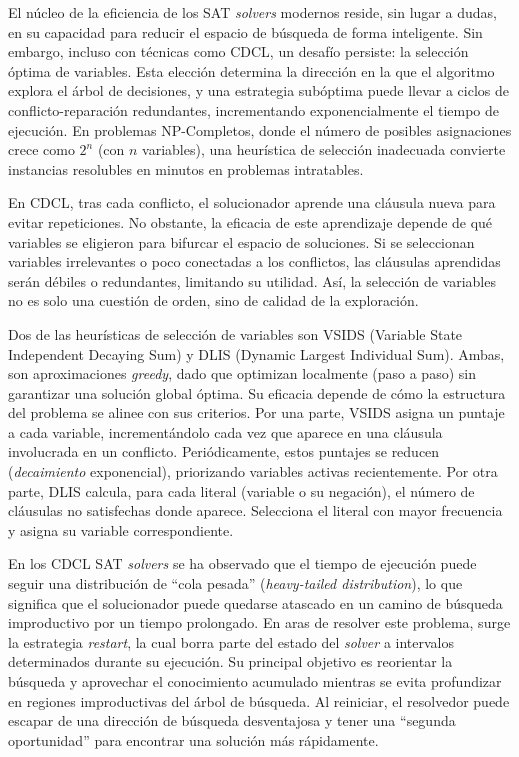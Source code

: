 
El núcleo de la eficiencia de los SAT \textit{solvers} modernos reside, sin lugar a dudas, en su capacidad para reducir el espacio de búsqueda de forma inteligente. Sin embargo, incluso con técnicas como CDCL, un desafío persiste: la selección óptima de variables. Esta elección determina la dirección en la que el algoritmo explora el árbol de decisiones, y una estrategia subóptima puede llevar a ciclos de conflicto-reparación redundantes, incrementando exponencialmente el tiempo de ejecución. En problemas NP-Completos, donde el número de posibles asignaciones crece como $2^n$ (con $n$ variables), una heurística de selección inadecuada convierte instancias resolubles en minutos en problemas intratables.

En CDCL, tras cada conflicto, el solucionador aprende una cláusula nueva para evitar repeticiones. No obstante, la eficacia de este aprendizaje depende de qué variables se eligieron para bifurcar el espacio de soluciones. Si se seleccionan variables irrelevantes o poco conectadas a los conflictos, las cláusulas aprendidas serán débiles o redundantes, limitando su utilidad. Así, la selección de variables no es solo una cuestión de orden, sino de calidad de la exploración.

Dos de las heurísticas de selección de variables son VSIDS (Variable State Independent Decaying Sum) y DLIS (Dynamic Largest Individual Sum). Ambas, son aproximaciones \textit{greedy}, dado que optimizan localmente (paso a paso) sin garantizar una solución global óptima. Su eficacia depende de cómo la estructura del problema se alinee con sus criterios. Por una parte, VSIDS asigna un puntaje a cada variable, incrementándolo cada vez que aparece en una cláusula involucrada en un conflicto. Periódicamente, estos puntajes se reducen (\textit{decaimiento} exponencial), priorizando variables activas recientemente. Por otra parte, DLIS calcula, para cada literal (variable o su negación), el número de cláusulas no satisfechas donde aparece. Selecciona el literal con mayor frecuencia y asigna su variable correspondiente.

En los CDCL SAT \textit{solvers} se ha observado que el tiempo de ejecución puede seguir una distribución de ``cola pesada'' (\textit{heavy-tailed distribution}), lo que significa que el solucionador puede quedarse atascado en un camino de búsqueda improductivo por un tiempo prolongado. En aras de resolver este problema, surge la estrategia \textit{restart}, la cual borra parte del estado del \textit{solver} a intervalos determinados durante su ejecución. Su principal objetivo es reorientar la búsqueda y aprovechar el conocimiento acumulado mientras se evita profundizar en regiones improductivas del árbol de búsqueda. Al reiniciar, el resolvedor puede escapar de una dirección de búsqueda desventajosa y tener una ``segunda oportunidad'' para encontrar una solución más rápidamente.



